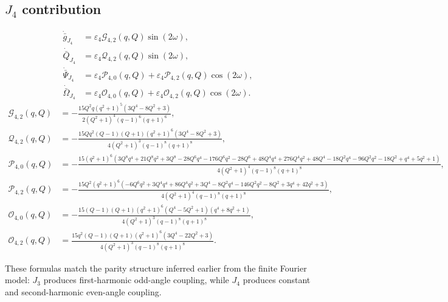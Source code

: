 \documentclass[10pt]{article}
\begin{document}
\subsection*{$J_4$ contribution}
\begin{align}
\dot{\bar g}_{J_4} &= \varepsilon_4 \mathcal{G}_{4,2}(q,Q)\sin(2\omega),\\
\dot{\bar Q}_{J_4} &= \varepsilon_4 \mathcal{Q}_{4,2}(q,Q)\sin(2\omega),\\
\dot{\bar\Psi}_{J_4} &= \varepsilon_4 \mathcal{P}_{4,0}(q,Q) + \varepsilon_4 \mathcal{P}_{4,2}(q,Q)\cos(2\omega),\\
\dot{\bar\Omega}_{J_4} &= \varepsilon_4 \mathcal{O}_{4,0}(q,Q) + \varepsilon_4 \mathcal{O}_{4,2}(q,Q)\cos(2\omega).
\end{align}
\begingroup\footnotesize
\begin{align}
\mathcal{G}_{4,2}(q,Q) &= - \frac{15 Q^{2} q \left(q^{2} + 1\right)^{5} \left(3 Q^{4} - 8 Q^{2} + 3\right)}{2 \left(Q^{2} + 1\right)^{4} \left(q - 1\right)^{6} \left(q + 1\right)^{6}},\\
\mathcal{Q}_{4,2}(q,Q) &= - \frac{15 Q q^{2} \left(Q - 1\right) \left(Q + 1\right) \left(q^{2} + 1\right)^{6} \left(3 Q^{4} - 8 Q^{2} + 3\right)}{4 \left(Q^{2} + 1\right)^{3} \left(q - 1\right)^{8} \left(q + 1\right)^{8}},\\
\mathcal{P}_{4,0}(q,Q) &= - \frac{15 \left(q^{2} + 1\right)^{6} \left(3 Q^{8} q^{4} + 21 Q^{8} q^{2} + 3 Q^{8} - 28 Q^{6} q^{4} - 176 Q^{6} q^{2} - 28 Q^{6} + 48 Q^{4} q^{4} + 276 Q^{4} q^{2} + 48 Q^{4} - 18 Q^{2} q^{4} - 96 Q^{2} q^{2} - 18 Q^{2} + q^{4} + 5 q^{2} + 1\right)}{4 \left(Q^{2} + 1\right)^{4} \left(q - 1\right)^{8} \left(q + 1\right)^{8}},\\
\mathcal{P}_{4,2}(q,Q) &= - \frac{15 Q^{2} \left(q^{2} + 1\right)^{6} \left(- 6 Q^{6} q^{2} + 3 Q^{4} q^{4} + 86 Q^{4} q^{2} + 3 Q^{4} - 8 Q^{2} q^{4} - 146 Q^{2} q^{2} - 8 Q^{2} + 3 q^{4} + 42 q^{2} + 3\right)}{4 \left(Q^{2} + 1\right)^{4} \left(q - 1\right)^{8} \left(q + 1\right)^{8}},\\
\mathcal{O}_{4,0}(q,Q) &= - \frac{15 \left(Q - 1\right) \left(Q + 1\right) \left(q^{2} + 1\right)^{6} \left(Q^{4} - 5 Q^{2} + 1\right) \left(q^{4} + 8 q^{2} + 1\right)}{4 \left(Q^{2} + 1\right)^{3} \left(q - 1\right)^{8} \left(q + 1\right)^{8}},\\
\mathcal{O}_{4,2}(q,Q) &= \frac{15 q^{2} \left(Q - 1\right) \left(Q + 1\right) \left(q^{2} + 1\right)^{6} \left(3 Q^{4} - 22 Q^{2} + 3\right)}{4 \left(Q^{2} + 1\right)^{3} \left(q - 1\right)^{8} \left(q + 1\right)^{8}}.
\end{align}
\endgroup

These formulas match the parity structure inferred earlier from the finite Fourier model:
$J_3$ produces first-harmonic odd-angle coupling, while $J_4$ produces constant and second-harmonic even-angle coupling.
\end{document}
